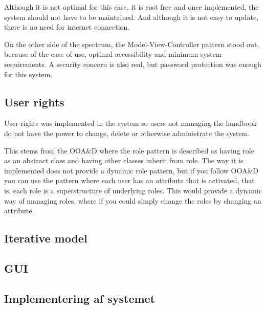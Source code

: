 Although it is not optimal for this case, it is cost free and once implemented, the system should not have to be maintained. And although it is not easy to update, there is no need for internet connection.

On the other side of the spectrum, the Model-View-Controller pattern stood out, because of the ease of use, optimal accessibility and minimum system requirements. A security concern is also real, but password protection was enough for this system.

\subsection{User rights}

User rights was implemented in the system so users not managing the handbook do not have the power to change, delete or otherwise administrate the system. 

This stems from the OOA\&D where the role pattern is described as having role as an abstract class and having other classes inherit from role. The way it is implemented does not provide a dynamic role pattern, but if you follow OOA\&D you can use the pattern where each user has an attribute that is activated, that is, each role is a superstructure of underlying roles. This would provide a dynamic way of managing roles, where if you could simply change the roles by changing an attribute. 

\subsection{Iterative model}

\subsection{GUI}

\subsection{Implementering af systemet}

